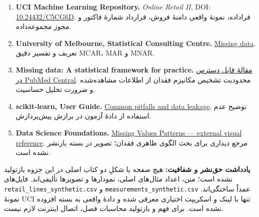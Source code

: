 \documentclass[12pt,a4paper,oneside]{book}
\providecommand{\tightlist}{\setlength{\itemsep}{0pt}\setlength{\parskip}{0pt}}
\begin{document}
\begin{enumerate}
\def\labelenumi{\arabic{enumi}.}
\setcounter{enumi}{2}
\tightlist
\item
  \textbf{UCI Machine Learning Repository.} \emph{Online Retail II}, DOI: \href{https://doi.org/10.24432/C5CG6D}{10.24432/C5CG6D}. فراداده، نمونهٔ واقعی دامنهٔ فروش، قرارداد شمارهٔ فاکتور و مجوز مجموعه‌داده.
\item
  \textbf{University of Melbourne, Statistical Consulting Centre.} \href{https://scc.ms.unimelb.edu.au/resources/preparing-your-data/missing-data}{Missing data}. تعریف و تفسیر دقیق MCAR، MAR و MNAR.
\item
  \textbf{Missing data: A statistical framework for practice.} \href{https://pmc.ncbi.nlm.nih.gov/articles/PMC7615108/}{مقالهٔ قابل دسترس در PubMed Central}. محدودیت تشخیص مکانیزم فقدان از اطلاعات مشاهده‌شده و ضرورت تحلیل حساسیت.
\item
  \textbf{scikit-learn, User Guide.} \href{https://scikit-learn.org/stable/common_pitfalls.html}{Common pitfalls and data leakage}. توضیح عدم استفاده از دادهٔ آزمون در برازش پیش‌پردازش.
\item
  \textbf{Data Science Foundations.} \href{https://hkurzweil.github.io/DataScienceFoundations/external/missing-values-patterns.png}{Missing Values Patterns --- external visual reference}. مرجع دیداری برای بحث الگوی ظاهری فقدان؛ تصویر در بسته بازنشر نشده است.
\end{enumerate}

\textbf{یادداشت حق‌نشر و شفافیت:} هیچ صفحه یا شکلِ دو کتاب اصلی در این جزوه بازتولید نشده است؛ متن، اعداد مثال‌های اصلی، نمودارها و تصویرها تألیفی‌اند. فایل‌های \texttt{retail\_lines\_synthetic.csv} و \texttt{measurements\_synthetic.csv} عمداً ساختگی‌اند. نمونهٔ UCI تنها با لینک و اسکریپت اختیاری معرفی شده و دادهٔ واقعی به بسته افزوده نشده است. برای فهم و بازتولید محاسبات فصل، اتصال اینترنت لازم نیست.

\backmatter
\end{document}
